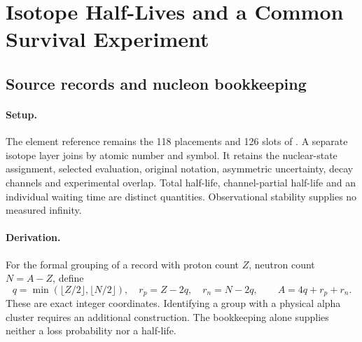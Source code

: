 \section{Isotope Half-Lives and a Common Survival Experiment}
\label{manual2:isotope-survival}


\subsection{Source records and nucleon bookkeeping}
\paragraph{Setup.}
The element reference remains the 118 placements and 126 slots of .
A separate isotope layer joins by atomic number and symbol. It retains the nuclear-state
assignment, selected evaluation, original notation, asymmetric uncertainty, decay channels
and experimental overlap. Total half-life, channel-partial half-life and an individual
waiting time are distinct quantities. Observational stability supplies no measured infinity.

\paragraph{Derivation.}
For the formal grouping of a record with proton count \(Z\), neutron count \(N=A-Z\), define
\begin{equation}
q=\min(\lfloor Z/2\rfloor,\lfloor N/2\rfloor),\quad
r_p=Z-2q,\quad r_n=N-2q,\qquad A=4q+r_p+r_n.
\label{eq:manual2-isotope-grouping}
\end{equation}
These are exact integer coordinates. Identifying a group with a physical alpha cluster
requires an additional construction. The bookkeeping alone supplies neither a loss
probability nor a half-life.

